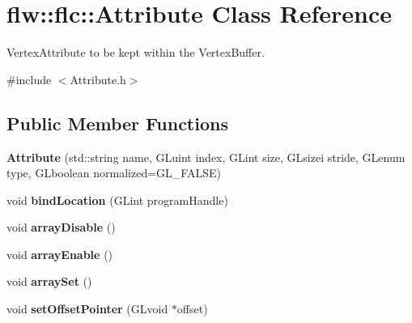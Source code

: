 \hypertarget{classflw_1_1flc_1_1Attribute}{}\section{flw\+:\+:flc\+:\+:Attribute Class Reference}
\label{classflw_1_1flc_1_1Attribute}


Vertex\+Attribute to be kept within the Vertex\+Buffer.  




{\ttfamily \#include $<$Attribute.\+h$>$}

\subsection*{Public Member Functions}
\begin{DoxyCompactItemize}
\item 
{\bfseries Attribute} (std\+::string name, G\+Luint index, G\+Lint size, G\+Lsizei stride, G\+Lenum type, G\+Lboolean normalized=G\+L\+\_\+\+F\+A\+L\+SE)\hypertarget{classflw_1_1flc_1_1Attribute_abbe4ffba91aaefc787ac017d592e6773}{}\label{classflw_1_1flc_1_1Attribute_abbe4ffba91aaefc787ac017d592e6773}

\item 
void {\bfseries bind\+Location} (G\+Lint program\+Handle)\hypertarget{classflw_1_1flc_1_1Attribute_a41919e71608837ae29fda0b7d4ed7855}{}\label{classflw_1_1flc_1_1Attribute_a41919e71608837ae29fda0b7d4ed7855}

\item 
void {\bfseries array\+Disable} ()\hypertarget{classflw_1_1flc_1_1Attribute_a396301fa91b8fd19bd164fd9470c2e49}{}\label{classflw_1_1flc_1_1Attribute_a396301fa91b8fd19bd164fd9470c2e49}

\item 
void {\bfseries array\+Enable} ()\hypertarget{classflw_1_1flc_1_1Attribute_a9310a69f020ef1ad2f4b5e7be4ad58c4}{}\label{classflw_1_1flc_1_1Attribute_a9310a69f020ef1ad2f4b5e7be4ad58c4}

\item 
void {\bfseries array\+Set} ()\hypertarget{classflw_1_1flc_1_1Attribute_a290fa65aa89c96dfa8f4b9ee29342857}{}\label{classflw_1_1flc_1_1Attribute_a290fa65aa89c96dfa8f4b9ee29342857}

\item 
void {\bfseries set\+Offset\+Pointer} (G\+Lvoid $\ast$offset)\hypertarget{classflw_1_1flc_1_1Attribute_aec34115f61968c272e1724294988341b}{}\label{classflw_1_1flc_1_1Attribute_aec34115f61968c272e1724294988341b}


\end{DoxyCompactItemize}
